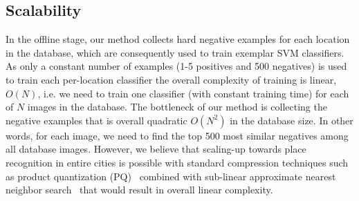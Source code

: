 \subsection{\textcolor{petr}{Scalability}}
\label{sec:scalability}
\textcolor{petr}{
In the offline stage, our method collects hard negative examples for each location in the database, which are consequently used to train exemplar SVM classifiers. 
As only a constant number of examples (1-5 positives and 500 negatives) is used to train each per-location classifier the overall complexity of training is linear, $O(N)$, i.e. we need to train one classifier (with constant training time) for each of $N$ images in the database. The bottleneck of our method is collecting the negative examples that is overall quadratic $O(N^2)$ in the database size. In other words, for each image, we need to find the top 500 most similar negatives among all database images.
However, we believe that scaling-up towards place recognition in entire cities is possible with standard compression techniques such as product quantization (PQ)~\cite{Jegou11} combined with sub-linear approximate nearest neighbor search~\cite{Flann2014} that would result in overall linear complexity. 
}

